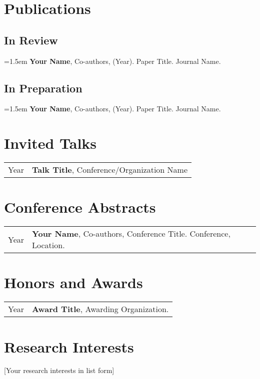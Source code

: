 \section{Publications}

\subsection{In Review} 
\hangindent=1.5em 
\textbf{Your Name}, Co-authors, (Year). Paper Title. Journal Name.

\subsection{In Preparation}
\hangindent=1.5em 
\textbf{Your Name}, Co-authors, (Year). Paper Title. Journal Name. 

\section{Invited Talks}
\begin{tabularx}{\textwidth}{>{\raggedright\arraybackslash}p{1cm} X}
Year & \textbf{Talk Title}, Conference/Organization Name \\
\end{tabularx}

\section{Conference Abstracts}
\begin{tabularx}{\textwidth}{>{\raggedright\arraybackslash}p{1cm} X}
Year & \textbf{Your Name}, Co-authors, Conference Title. Conference, Location.
\end{tabularx}

\section{Honors and Awards}
\begin{tabularx}{\textwidth}{>{\raggedright\arraybackslash}p{1cm} X}
Year & \textbf{Award Title}, Awarding Organization.
\end{tabularx}

\section{Research Interests} %
    [Your research interests in list form]

